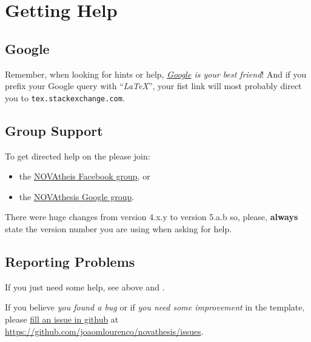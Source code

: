 \section{Getting Help}
\label{sec:getting_help}

\begin{center}  
\end{center}
 
\subsection{Google}
\label{sub:group_google}

Remember, when looking for hints or help, \emph{\href{google.com}{Google} is your best friend}!   And if you prefix your Google query with “\emph{LaTeX}”, your fist link will most probably direct you to \texttt{tex.stackexchange.com}.

\subsection{Group Support}
\label{sub:group_support}

To get directed help on the  please join:
\begin{itemize}
  \item the \href{https://www.facebook.com/groups/novathesis}{NOVAtheis Facebook group}, or
  \item the \href{https://groups.google.com/forum/#!forum/novathesis}{NOVAthesis Google group}.
\end{itemize}

There were huge changes from version 4.x.y to version 5.a.b so, please, \textbf{always} state the version number you are using when asking for help.

\subsection{Reporting Problems}
\label{sub:reporting_problems}

If you just need some help, see above  and .

If you believe \emph{you found a bug} or if \emph{you need some improvement} in the template, please \href{https://github.com/joaomlourenco/novathesis/issues}{fill an issue in github} at \url{https://github.com/joaomlourenco/novathesis/issues}.


